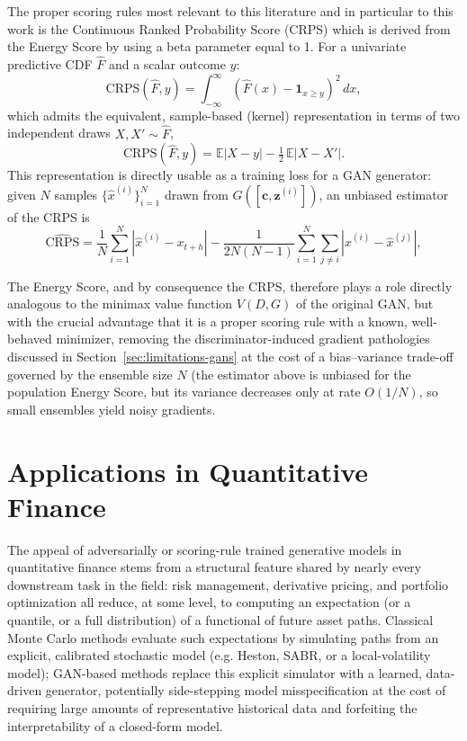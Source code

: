 The proper scoring rules most relevant to this literature and in particular to this work is the Continuous Ranked Probability Score (CRPS) which is derived from the Energy Score by using a beta parameter equal to 1.
For a univariate predictive CDF $\hat F$ and a scalar outcome $y$:
\begin{equation}
    \label{eq:CRPS}
\mathrm{CRPS}(\hat F, y) = \int_{-\infty}^{\infty} \left( \hat F(x) - \mathbf{1}_{x \ge y} \right)^2 \, dx,
\end{equation}
which admits the equivalent, sample-based (kernel) representation in terms of two independent draws $X, X' \sim \hat F$,
\begin{equation}
\mathrm{CRPS}(\hat F, y) = \mathbb{E}\left| X - y \right| - \tfrac{1}{2}\, \mathbb{E}\left| X - X' \right|.
\end{equation}
This representation is directly usable as a training loss for a GAN generator: given $N$ samples $\{\hat x^{(i)}\}_{i=1}^N$ drawn from $G([\mathbf{c},\mathbf{z}^{(i)}])$, an unbiased estimator of the CRPS is
\begin{equation}
    \label{eq:CRPS_estimator}
\widehat{\mathrm{CRPS}} = \frac{1}{N} \sum_{i=1}^{N} \left| \hat x^{(i)} - x_{t+h} \right| - \frac{1}{2 N (N-1)} \sum_{i=1}^{N} \sum_{j \neq i} \left| \hat x^{(i)} - \hat x^{(j)} \right|,
\end{equation}


The Energy Score, and by consequence the CRPS, therefore plays a role directly analogous to the minimax value function $V(D,G)$ of the original GAN, but with the crucial advantage that it is a proper scoring rule with a known, well-behaved minimizer, removing the discriminator-induced gradient pathologies discussed in Section~\ref{sec:limitations-gans} at the cost of a bias--variance trade-off governed by the ensemble size $N$ (the estimator above is unbiased for the population Energy Score, but its variance decreases only at rate $O(1/N)$, so small ensembles yield noisy gradients.


\section{Applications in Quantitative Finance}
 
The appeal of adversarially or scoring-rule
trained generative models in quantitative 
finance stems from a structural feature 
shared by nearly every downstream task in the field: 
risk management, derivative pricing, and portfolio 
optimization all reduce, at some level, 
to computing an expectation (or a quantile, or a full distribution) 
of a functional of future asset paths. 
Classical Monte Carlo methods evaluate 
such expectations by simulating paths 
from an explicit, calibrated stochastic model 
(e.g. Heston, SABR, or a local-volatility model); 
GAN-based methods replace 
this explicit simulator with a 
learned, data-driven generator, 
potentially side-stepping model 
misspecification at the cost of 
requiring large amounts of 
representative historical data and 
forfeiting the interpretability of a closed-form model.\\

